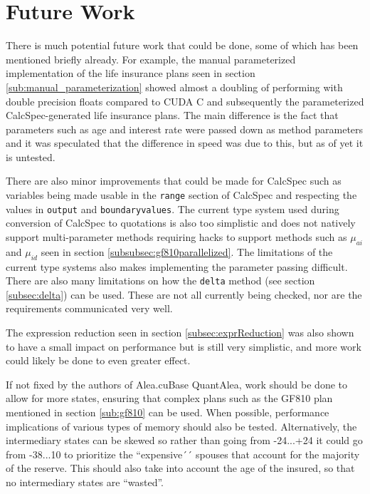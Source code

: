 \section{Future Work}
There is much potential future work that could be done, some of which has been mentioned briefly already.
For example, the manual parameterized implementation of the life insurance plans seen in section \ref{sub:manual_parameterization} showed almost a doubling of performing with double precision floats compared to CUDA C and subsequently the parameterized CalcSpec-generated life insurance plans.
The main difference is the fact that parameters such as age and interest rate were passed down as method parameters and it was speculated that the difference in speed was due to this, but as of yet it is untested.

There are also minor improvements that could be made for CalcSpec such as variables being made usable in the \lstinline$range$ section of CalcSpec and respecting the values in \lstinline$output$ and \lstinline$boundaryvalues$.
The current type system used during conversion of CalcSpec to quotations is also too simplistic and does not natively support multi-parameter methods requiring hacks to support methods such as $\mu_{ai}$ and $\mu_{id}$ seen in section \ref{subsubsec:gf810parallelized}.
The limitations of the current type systems also makes implementing the parameter passing difficult.
There are also many limitations on how the \lstinline$delta$ method (see section \ref{subsec:delta}) can be used.
These are not all currently being checked, nor are the requirements communicated very well.

The expression reduction seen in section \ref{subsec:exprReduction} was also shown to have a small impact on performance but is still very simplistic, and more work could likely be done to even greater effect.

If not fixed by the authors of Alea.cuBase QuantAlea, work should be done to allow for more states, ensuring that complex plans such as the GF810 plan mentioned in section \ref{sub:gf810} can be used.
When possible, performance implications of various types of memory should also be tested.
Alternatively, the intermediary states can be skewed so rather than going from -24...+24 it could go from -38...10 to prioritize the ``expensive´´ spouses that account for the majority of the reserve.
This should also take into account the age of the insured, so that no intermediary states are ``wasted''.

